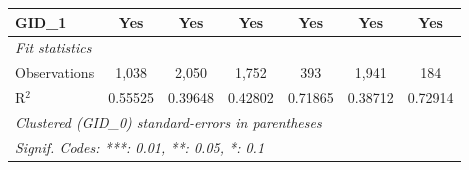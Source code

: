 \begin{tabular}{lcccccc}
   GID\_1             & Yes                     & Yes                     & Yes                     & Yes                            & Yes                           & Yes\\  
   \midrule
   \emph{Fit statistics}\\
   Observations       & 1,038                   & 2,050                   & 1,752                   & 393                            & 1,941                         & 184\\  
   R$^2$              & 0.55525                 & 0.39648                 & 0.42802                 & 0.71865                        & 0.38712                       & 0.72914\\  
   \midrule \midrule
   \multicolumn{7}{l}{\emph{Clustered (GID\_0) standard-errors in parentheses}}\\
   \multicolumn{7}{l}{\emph{Signif. Codes: ***: 0.01, **: 0.05, *: 0.1}}\\
\end{tabular}
\par\endgroup



